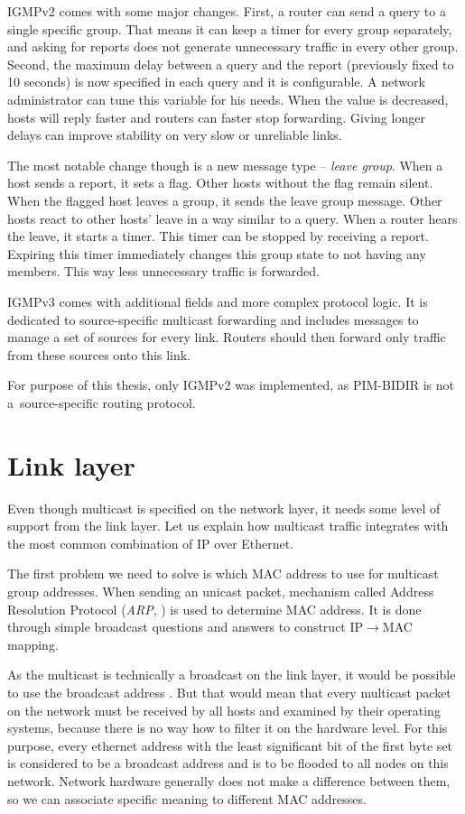 IGMPv2 \cite{rfc2236} comes with some major changes. First, a router can send
a query to a single specific group. That means it can keep a timer for every group
separately, and asking for reports does not generate unnecessary traffic in
every other group. Second, the maximum delay between a query and the report
(previously fixed to 10 seconds) is now specified in each query and it is
configurable. A network administrator can tune this variable for his needs.
When the value is decreased, hosts will reply faster and routers can faster stop
forwarding. Giving longer delays can improve stability on very slow or
unreliable links.

The most notable change though is a new message type -- \emph{leave group}. When a host
sends a report, it sets a flag. Other hosts without the flag remain silent. When
the flagged host leaves a group, it sends the leave group message. Other hosts
react to other hosts' leave in a way similar to a query. When a router hears the leave,
it starts a timer. This timer can be stopped by receiving a report. Expiring this
timer immediately changes this group state to not having any members. This way
less unnecessary traffic is forwarded.

IGMPv3 comes with additional fields and more complex protocol logic. It is
dedicated to source-specific multicast forwarding and includes messages to manage
a set of sources for every link. Routers should then forward only traffic from
these sources onto this link.

For purpose of this thesis, only IGMPv2 was implemented, as PIM-BIDIR is not
a~source-specific routing protocol.

\section{Link layer}

Even though multicast is specified on the network layer, it needs some level of
support from the link layer. Let us explain how multicast traffic integrates with
the most common combination of IP over Ethernet.

The first problem we need to solve is which MAC address to use for multicast
group addresses. When sending an unicast packet, mechanism called Address
Resolution Protocol (\emph{ARP}, ) is used to determine MAC address. It is done
through simple broadcast questions and answers to construct IP$\rightarrow$MAC mapping.

As the multicast is technically a broadcast on the link layer, it would be possible to
use the broadcast address .
But that would mean that every multicast packet on the network must be received by all
hosts and examined by their operating systems, because there is no way how to filter
it on the hardware level. For this purpose, every ethernet address with the
least significant bit of the first byte set is considered to be
a broadcast address and is to be flooded to all nodes on this network. Network
hardware generally does not make a difference between them, so we can associate
specific meaning to different MAC addresses.

